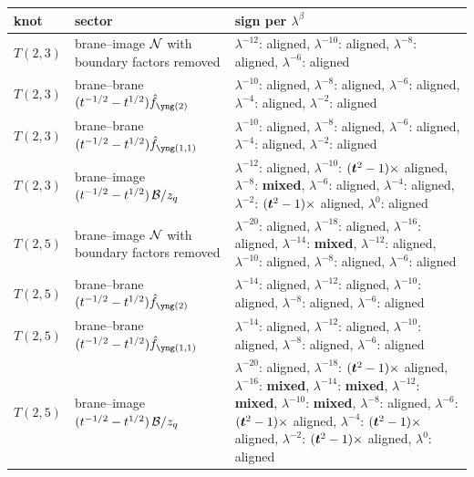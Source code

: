 \begin{center}
\footnotesize
\begin{tabular}{llp{7cm}}
\toprule
knot & sector & sign per $\lambda^\beta$ \\
\midrule
$T(2,3)$ & brane--image $\mathcal{N}$ with boundary factors removed & $\lambda^{-12}$: aligned, \allowbreak $\lambda^{-10}$: aligned, \allowbreak $\lambda^{-8}$: aligned, \allowbreak $\lambda^{-6}$: aligned \\
$T(2,3)$ & brane--brane $(t^{-1/2} - t^{1/2})\hat f_{\ytwo}$ & $\lambda^{-10}$: aligned, $\lambda^{-8}$: aligned, $\lambda^{-6}$: aligned, $\lambda^{-4}$: aligned, $\lambda^{-2}$: aligned \\
$T(2,3)$ & brane--brane $(t^{-1/2} - t^{1/2})\hat f_{\yoneone}$ & $\lambda^{-10}$: aligned, $\lambda^{-8}$: aligned, $\lambda^{-6}$: aligned, $\lambda^{-4}$: aligned, $\lambda^{-2}$: aligned \\
$T(2,3)$ & brane--image $(t^{-1/2} - t^{1/2})\,\mathcal{B}/z_q$ & $\lambda^{-12}$: aligned, $\lambda^{-10}$: $(\bm{t}^2 - 1)\times$ aligned, $\lambda^{-8}$: \textbf{mixed}, $\lambda^{-6}$: aligned, $\lambda^{-4}$: aligned, $\lambda^{-2}$: $(\bm{t}^2 - 1)\times$ aligned, $\lambda^{0}$: aligned \\
$T(2,5)$ & brane--image $\mathcal{N}$ with boundary factors removed & $\lambda^{-20}$: aligned, \allowbreak $\lambda^{-18}$: aligned, \allowbreak $\lambda^{-16}$: aligned, \allowbreak $\lambda^{-14}$: \textbf{mixed}, \allowbreak $\lambda^{-12}$: aligned, \allowbreak $\lambda^{-10}$: aligned, \allowbreak $\lambda^{-8}$: aligned, \allowbreak $\lambda^{-6}$: aligned \\
$T(2,5)$ & brane--brane $(t^{-1/2} - t^{1/2})\hat f_{\ytwo}$ & $\lambda^{-14}$: aligned, $\lambda^{-12}$: aligned, $\lambda^{-10}$: aligned, $\lambda^{-8}$: aligned, $\lambda^{-6}$: aligned \\
$T(2,5)$ & brane--brane $(t^{-1/2} - t^{1/2})\hat f_{\yoneone}$ & $\lambda^{-14}$: aligned, $\lambda^{-12}$: aligned, $\lambda^{-10}$: aligned, $\lambda^{-8}$: aligned, $\lambda^{-6}$: aligned \\
$T(2,5)$ & brane--image $(t^{-1/2} - t^{1/2})\,\mathcal{B}/z_q$ & $\lambda^{-20}$: aligned, $\lambda^{-18}$: $(\bm{t}^2 - 1)\times$ aligned, $\lambda^{-16}$: \textbf{mixed}, $\lambda^{-14}$: \textbf{mixed}, $\lambda^{-12}$: \textbf{mixed}, $\lambda^{-10}$: \textbf{mixed}, $\lambda^{-8}$: aligned, $\lambda^{-6}$: $(\bm{t}^2 - 1)\times$ aligned, $\lambda^{-4}$: $(\bm{t}^2 - 1)\times$ aligned, $\lambda^{-2}$: $(\bm{t}^2 - 1)\times$ aligned, $\lambda^{0}$: aligned \\
\bottomrule
\end{tabular}
\end{center}
